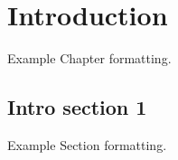 \chapter{Introduction}
\label{c:intro}


Example Chapter formatting. 

\section{Intro section 1}

Example Section formatting. 



		
		